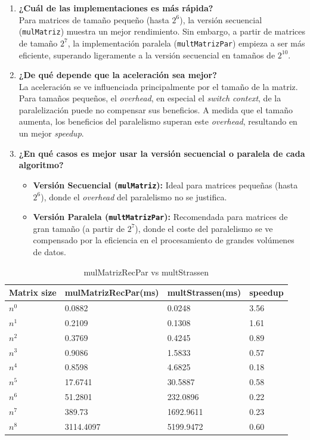 \documentclass[12pt, a4paper]{article}
\begin{document}
\begin{enumerate}
  \item \textbf{¿Cuál de las implementaciones es más rápida?} \\
  Para matrices de tamaño pequeño (hasta $2^6$), la versión secuencial (\texttt{mulMatriz}) muestra un mejor rendimiento. Sin embargo, a partir de matrices de tamaño $2^7$, la implementación paralela (\texttt{multMatrizPar}) empieza a ser más eficiente, superando ligeramente a la versión secuencial en tamaños de $2^{10}$.

  \item \textbf{¿De qué depende que la aceleración sea mejor?} \\
  La aceleración se ve influenciada principalmente por el tamaño de la matriz. Para tamaños pequeños, el \textit{overhead}, en especial el \textit{switch context}, de la paralelización puede no compensar sus beneficios. A medida que el tamaño aumenta, los beneficios del paralelismo superan este \textit{overhead}, resultando en un mejor \textit{speedup}.

  \item \textbf{¿En qué casos es mejor usar la versión secuencial o paralela de cada algoritmo?} \\
  \begin{itemize}
    \item \textbf{Versión Secuencial (\texttt{mulMatriz}):} Ideal para matrices pequeñas (hasta $2^6$), donde el \textit{overhead} del paralelismo no se justifica.
    \item \textbf{Versión Paralela (\texttt{multMatrizPar}):} Recomendada para matrices de gran tamaño (a partir de $2^7$), donde el coste del paralelismo se ve compensado por la eficiencia en el procesamiento de grandes volúmenes de datos.
  \end{itemize}
\end{enumerate}

\begin{table}[h]
    \centering
    \begin{tabular}{ | m{2cm} | m{4cm} | m{4cm} | m{3cm} | }
    \hline
    Matrix size & mulMatrizRecPar(ms) & multStrassen(ms) & speedup \\ 
    \hline
    $n^0$ & 0.0882 & 0.0248 & 3.56 \\
    $n^1$ & 0.2109 & 0.1308 & 1.61 \\
    $n^2$ & 0.3769 & 0.4245 & 0.89 \\
    $n^3$ & 0.9086 & 1.5833 & 0.57 \\
    $n^4$ & 0.8598 & 4.6825 & 0.18 \\
    $n^5$ & 17.6741 & 30.5887 & 0.58 \\
    $n^6$ & 51.2801 & 232.0896 & 0.22 \\
    $n^7$ & 389.73 & 1692.9611 & 0.23 \\
    $n^8$ & 3114.4097 & 5199.9472 & 0.60 \\
    \hline
    \end{tabular}
    \caption{mulMatrizRecPar vs multStrassen}
    \label{table:matrix_performance}
\end{table}
\end{document}
